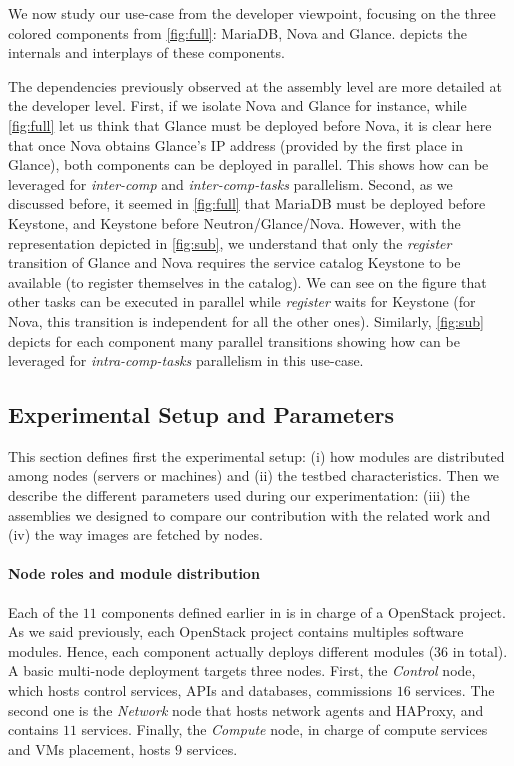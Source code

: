 We now study our use-case from the developer viewpoint, focusing on
the three colored components from \cref{fig:full}: MariaDB, Nova and
Glance.   depicts the internals and interplays of these
components.

The dependencies previously observed at the assembly level are more
detailed at the developer level. First, if we isolate Nova and Glance
for instance, while \cref{fig:full} let us think that Glance must be
deployed before Nova, it is clear here that once Nova obtains Glance's
IP address (provided by the first place in Glance), both components
can be deployed in parallel. This shows how \mad can be leveraged for
\emph{inter-comp} and \emph{inter-comp-tasks} parallelism.  Second, as we
discussed before, it seemed in \cref{fig:full} that MariaDB must be
deployed before Keystone, and Keystone before
Neutron/Glance/Nova. However, with the \mad representation depicted in
\cref{fig:sub}, we understand that only the \emph{register} transition
of Glance and Nova requires the service catalog Keystone to be
available (\ie to register themselves in the catalog). We can see on
the figure that other tasks can be executed in parallel while
\emph{register} waits for Keystone (\eg for Nova, this transition is
independent for all the other ones). Similarly, \cref{fig:sub} depicts
for each component many parallel transitions showing how \mad can be
leveraged for \emph{intra-comp-tasks} parallelism in this use-case.


\subsection{Experimental Setup and Parameters}

This section defines first the experimental setup: (i) how modules are
distributed among nodes (\ie servers or machines) and (ii) the testbed
characteristics. Then we describe the different parameters used during
our experimentation: (iii) the assemblies we designed to compare our
contribution with the related work and (iv) the way \docker images are
fetched by nodes.

\paragraph{Node roles and module distribution}
Each of the $11$ components defined earlier in \kolla is in charge of
a OpenStack project. As we said previously, each OpenStack project
contains multiples software modules. Hence, each component actually
deploys different modules ($36$ in total). A basic multi-node \kolla
deployment targets three nodes. First, the \emph{Control} node, which
hosts control services, APIs and databases, commissions $16$
services. The second one is the \emph{Network} node that hosts network
agents and HAProxy, and contains $11$ services. Finally, the
\emph{Compute} node, in charge of compute services and VMs placement,
hosts $9$ services.


